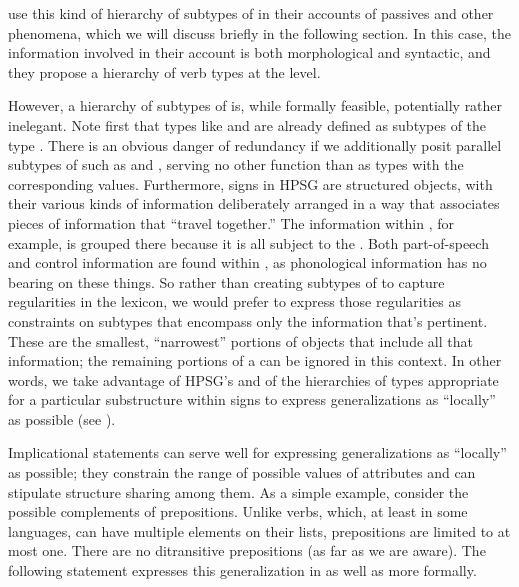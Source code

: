 \documentclass[output=paper
 	        ,biblatex
                ,babelshorthands
                ,newtxmath
                ,draftmode
                ,colorlinks, citecolor=brown
]{langscibook}
\begin{document}
\citet{AckermanandWebelhuth1998}
 use this kind of hierarchy of subtypes of  in their accounts of  passives and other phenomena, which we will discuss briefly in the following section.
In this case, the information involved in their account is both morphological and syntactic, and they propose a hierarchy of verb types at the  level.

However, a hierarchy of subtypes of  is, while formally feasible, potentially rather inelegant.
Note first that types like  and  are already defined as subtypes of the type .
There is an obvious danger of redundancy if we additionally posit parallel subtypes of  such as  and  , serving no other function than as types with the corresponding  values.
Furthermore, signs in HPSG are structured objects, with their various kinds of information deliberately arranged in a way that associates pieces of information that ``travel together.''
The information within , for example, is grouped there because it is all subject to the .
Both part-of-speech and control information are found within , as phonological information has no bearing on these things.
So rather than creating subtypes of  to capture regularities in the lexicon, we would prefer to express those regularities as constraints on subtypes that encompass only the information that's pertinent.
These are the smallest, ``narrowest'' portions of  objects that include all that information; the remaining portions of a  can be ignored in this context.
In other words, we take advantage of HPSG's  and of the hierarchies of types appropriate for a particular substructure within signs to express generalizations as ``locally'' as possible (see ).

Implicational statements can serve well for expressing generalizations as ``locally'' as possible; they constrain the range of possible values of attributes and can stipulate structure sharing among them.
As a simple example, consider the possible complements of prepositions.
Unlike verbs, which, at least in some languages, can have multiple elements on their  lists, prepositions are limited to at most one.
There are no ditransitive prepositions (as far as we are aware).
The following statement expresses this generalization in  as well as more formally.
\end{document}
